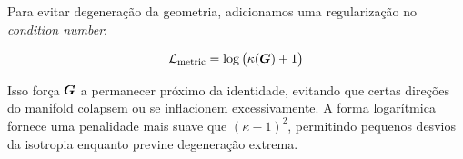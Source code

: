 Para evitar degenera\c{c}\~ao da geometria, adicionamos uma regulariza\c{c}\~ao
no \textit{condition number}:

\begin{equation}
    \mathcal{L}_{\text{metric}} = \log\big(\kappa(\bm{G}) + 1\big)
\end{equation}

Isso for\c{c}a $\bm{G}$ a permanecer pr\'oximo da identidade, evitando que
certas dire\c{c}\~oes do manifold colapsem ou se inflacionem
excessivamente. A forma logar\'itmica fornece uma penalidade mais suave
que $(\kappa - 1)^2$, permitindo pequenos desvios da isotropia enquanto
previne degenera\c{c}\~ao extrema.
